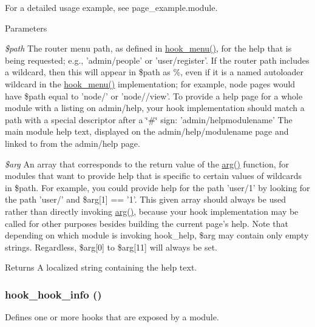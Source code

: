 For a detailed usage example, see page\_\-example.module.


\begin{DoxyParams}{Parameters}
\item[{\em \$path}]The router menu path, as defined in \hyperlink{group__hooks_ga5c95244fea59b25666e409759e133ded}{hook\_\-menu()}, for the help that is being requested; e.g., 'admin/people' or 'user/register'. If the router path includes a wildcard, then this will appear in \$path as \%, even if it is a named autoloader wildcard in the \hyperlink{group__hooks_ga5c95244fea59b25666e409759e133ded}{hook\_\-menu()} implementation; for example, node pages would have \$path equal to 'node/' or 'node//view'. To provide a help page for a whole module with a listing on admin/help, your hook implementation should match a path with a special descriptor after a \char`\"{}\#\char`\"{} sign: 'admin/helpmodulename' The main module help text, displayed on the admin/help/modulename page and linked to from the admin/help page. \item[{\em \$arg}]An array that corresponds to the return value of the \hyperlink{bootstrap_8inc_afd40bf1dc5dc1f68fb326a8f6e0b88da}{arg()} function, for modules that want to provide help that is specific to certain values of wildcards in \$path. For example, you could provide help for the path 'user/1' by looking for the path 'user/' and \$arg\mbox{[}1\mbox{]} == '1'. This given array should always be used rather than directly invoking \hyperlink{bootstrap_8inc_afd40bf1dc5dc1f68fb326a8f6e0b88da}{arg()}, because your hook implementation may be called for other purposes besides building the current page's help. Note that depending on which module is invoking hook\_\-help, \$arg may contain only empty strings. Regardless, \$arg\mbox{[}0\mbox{]} to \$arg\mbox{[}11\mbox{]} will always be set.\end{DoxyParams}
\begin{DoxyReturn}{Returns}
A localized string containing the help text. 
\end{DoxyReturn}
\hypertarget{group__hooks_ga65142e7864f445483786087d180a2010}{
\subsubsection[{hook\_\-hook\_\-info}]{\setlength{\rightskip}{0pt plus 5cm}hook\_\-hook\_\-info ()}}
\label{group__hooks_ga65142e7864f445483786087d180a2010}
Defines one or more hooks that are exposed by a module.

